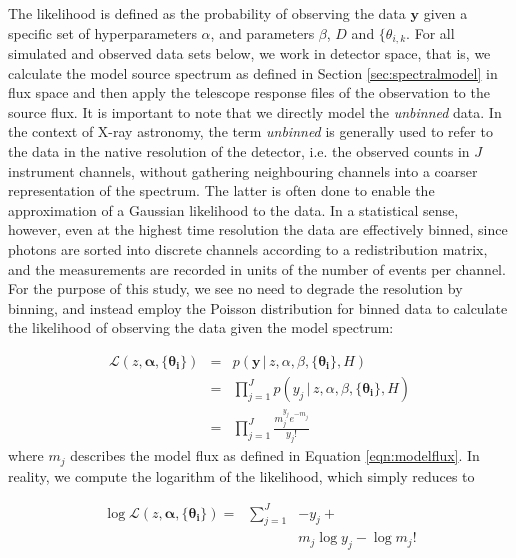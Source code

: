 \documentclass[12pt]{emulateapj}
\newcommand{\given}{\,|\,}
\newcommand{\counts}{y}
\newcommand{\pars}{\theta}
\newcommand{\mean}{m}
\newcommand{\likelihood}{{\mathcal L}}
\begin{document}
The likelihood is defined as the probability of observing the data $\bm{\counts}$ given a specific set of hyperparameters $\alpha$, and parameters $\beta$, $D$ and $\{\pars_{i,k}$. For all simulated and observed data sets below, we work in detector space, that is, we calculate the model source spectrum as defined in Section \ref{sec:spectralmodel} in flux space and then apply the telescope response files of the observation to the source flux. It is important to note that we directly model the \textit{unbinned} data. In the context of X-ray astronomy, the term \textit{unbinned} is generally used to refer to the data in the native resolution of the detector, i.e. the observed counts in $J$ instrument channels, without gathering neighbouring channels into a coarser representation of the spectrum. The latter is often done to enable the approximation of a Gaussian likelihood to the data. 
In a statistical sense, however, even at the highest time resolution the data are effectively binned, since photons are sorted into discrete channels according to a redistribution matrix, and the measurements are recorded in units of the number of events per channel.
For the purpose of this study, we see no need to degrade the resolution by binning, and instead employ the Poisson distribution for binned data to calculate the likelihood of observing the data given the model spectrum:

\begin{eqnarray}
\likelihood(z, \bm{\alpha}, \{\bm{\pars_{i}}\}) & = & p(\bm{\counts} \given z, \alpha, \beta, \{\bm{\pars_{i}}\}, H) \\ \nonumber
			& = & \prod_{j=1}^{J}{p(\counts_j \given z, \alpha, \beta, \{\bm{\pars_{i}}\}, H)} \\\nonumber
			& = &  \prod_{j=1}^{J} \frac{ \mean_j^{\counts_j} e^{-\mean_j}}{\counts_j !} 
\end{eqnarray}	
\noindent where $\mean_j$ describes the model flux as defined in Equation \ref{eqn:modelflux}. In reality, we compute the logarithm of the likelihood, which simply reduces to

\begin{eqnarray}
\log{\likelihood(z, \bm{\alpha}, \{\bm{\pars_{i}}\})} = & \sum_{j=1}^{J} & -\counts_j + \\ \nonumber 
					    & & \mean_j \log{\counts_j} - \log{\mean_j !} %
\end{eqnarray}
\end{document}
